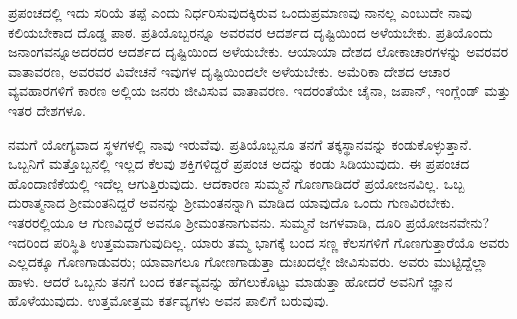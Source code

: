 ಪ್ರಪಂಚದಲ್ಲಿ ಇದು ಸರಿಯೆ ತಪ್ಪೆ ಎಂದು ನಿರ್ಧರಿಸುವುದಕ್ಕಿರುವ ಒಂದು\break ಪ್ರಮಾಣವು ನಾನಲ್ಲ ಎಂಬುದೇ ನಾವು ಕಲಿಯಬೇಕಾದ ದೊಡ್ಡ ಪಾಠ. ಪ್ರತಿಯೊಬ್ಬರನ್ನೂ ಅವರವರ ಆದರ್ಶದ ದೃಷ್ಟಿಯಿಂದ ಅಳೆಯಬೇಕು. ಪ್ರತಿಯೊಂದು ಜನಾಂಗವನ್ನೂ\break ಅದರದರ ಆದರ್ಶದ ದೃಷ್ಟಿಯಿಂದ ಅಳೆಯಬೇಕು. ಆಯಾಯಾ ದೇಶದ ಲೋಕಾಚಾರಗಳನ್ನು ಅವರವರ ವಾತಾವರಣ, ಅವರವರ ವಿವೇಚನೆ ಇವುಗಳ ದೃಷ್ಟಿಯಿಂದಲೇ ಅಳೆಯಬೇಕು. ಅಮೆರಿಕಾ ದೇಶದ ಆಚಾರ ವ್ಯವಹಾರಗಳಿಗೆ ಕಾರಣ ಅಲ್ಲಿಯ ಜನರು ಜೀವಿಸುವ ವಾತಾವರಣ. ಇದರಂತೆಯೇ ಚೈನಾ, ಜಪಾನ್​, ಇಂಗ್ಲೆಂಡ್​ ಮತ್ತು ಇತರ ದೇಶಗಳೂ.

ನಮಗೆ ಯೋಗ್ಯವಾದ ಸ್ಥಳಗಳಲ್ಲಿ ನಾವು ಇರುವೆವು. ಪ್ರತಿಯೊಬ್ಬನೂ ತನಗೆ ತಕ್ಕ\break ಸ್ಥಾನವನ್ನು ಕಂಡುಕೊಳ್ಳುತ್ತಾನೆ. ಒಬ್ಬನಿಗೆ ಮತ್ತೊಬ್ಬನಲ್ಲಿ ಇಲ್ಲದ ಕೆಲವು ಶಕ್ತಿಗಳಿದ್ದರೆ ಪ್ರಪಂಚ ಅದನ್ನು ಕಂಡು ಸಿಡಿಯುವುದು. ಈ ಪ್ರಪಂಚದ ಹೊಂದಾಣಿಕೆಯಲ್ಲಿ ಇದೆಲ್ಲ ಆಗುತ್ತಿರುವುದು. ಆದಕಾರಣ ಸುಮ್ಮನೆ ಗೊಣಗಾಡಿದರೆ ಪ್ರಯೋಜನವಿಲ್ಲ. ಒಬ್ಬ ದುರಾತ್ಮನಾದ ಶ‍್ರೀಮಂತನಿದ್ದರೆ ಅವನನ್ನು ಶ‍್ರೀಮಂತನನ್ನಾಗಿ ಮಾಡಿದ ಯಾವುದೊ ಒಂದು ಗುಣವಿರಬೇಕು. ಇತರರಲ್ಲಿಯೂ ಆ ಗುಣವಿದ್ದರೆ ಅವನೂ ಶ‍್ರೀಮಂತನಾಗುವನು. ಸುಮ್ಮನೆ ಜಗಳವಾಡಿ, ದೂರಿ ಪ್ರಯೋಜನವೇನು? ಇದರಿಂದ ಪರಿಸ್ಥಿತಿ ಉತ್ತಮವಾಗುವುದಿಲ್ಲ. ಯಾರು ತಮ್ಮ ಭಾಗಕ್ಕೆ ಬಂದ ಸಣ್ಣ ಕೆಲಸಗಳಿಗೆ ಗೊಣಗುತ್ತಾರೆಯೊ ಅವರು ಎಲ್ಲದಕ್ಕೂ ಗೊಣಗಾಡುವರು; ಯಾವಾಗಲೂ ಗೋಣಗಾಡುತ್ತಾ ದುಃಖದಲ್ಲೇ ಜೀವಿಸುವರು. ಅವರು ಮುಟ್ಟಿದ್ದೆಲ್ಲಾ ಹಾಳು. ಆದರೆ ಒಬ್ಬನು ತನಗೆ ಬಂದ ಕರ್ತವ್ಯವನ್ನು ಹೆಗಲುಕೊಟ್ಟು ಮಾಡುತ್ತಾ ಹೋದರೆ ಅವನಿಗೆ ಜ್ಞಾನ ಹೊಳೆಯುವುದು. ಉತ್ತಮೋತ್ತಮ ಕರ್ತವ್ಯಗಳು ಅವನ ಪಾಲಿಗೆ ಬರುವುವು.

